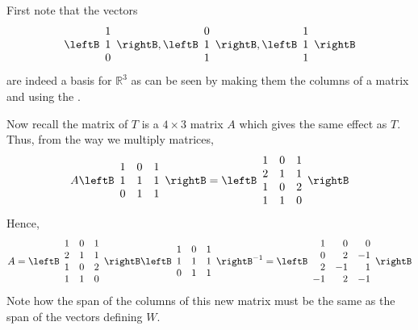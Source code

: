 \begin{solution}
 First note that the vectors 
\begin{equation*}
\leftB
\begin{array}{c}
1 \\ 
1 \\ 
0
\end{array}
\rightB ,\leftB 
\begin{array}{c}
0 \\ 
1 \\ 
1
\end{array}
\rightB ,\leftB 
\begin{array}{c}
1 \\ 
1 \\ 
1
\end{array}
\rightB
\end{equation*}
are indeed a basis for $\mathbb{R}^{3}$ as can be seen by making them the
columns of a matrix and using the \rref.

Now recall the matrix of $T$ is a $4\times 3$ matrix $A$ which gives the same
effect as $T.$ Thus, from the way we multiply matrices, 
\begin{equation*}
A\leftB
\begin{array}{rrr}
1 & 0 & 1 \\ 
1 & 1 & 1 \\ 
0 & 1 & 1
\end{array}
\rightB =\leftB 
\begin{array}{rrr}
1 & 0 & 1 \\ 
2 & 1 & 1 \\ 
1 & 0 & 2 \\ 
1 & 1 & 0
\end{array}
\rightB
\end{equation*}
Hence, 
\begin{equation*}
A=\leftB 
\begin{array}{rrr}
1 & 0 & 1 \\ 
2 & 1 & 1 \\ 
1 & 0 & 2 \\ 
1 & 1 & 0
\end{array}
\rightB \leftB 
\begin{array}{rrr}
1 & 0 & 1 \\ 
1 & 1 & 1 \\ 
0 & 1 & 1
\end{array}
\rightB ^{-1}=\leftB 
\begin{array}{rrr}
1 & 0 & 0 \\ 
0 & 2 & -1 \\ 
2 & -1 & 1 \\ 
-1 & 2 & -1
\end{array}
\rightB
\end{equation*}
Note how the span of the columns of this new matrix must be the same as the
span of the vectors defining $W$.
\end{solution}

